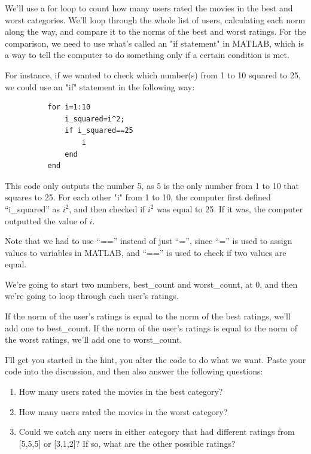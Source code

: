 \documentclass{ximera}
\begin{document}
    We'll use a for loop to count how many users rated the movies in the best and worst categories. We'll loop through the whole list of users, calculating each norm along the way, and compare it to the norms of the best and worst ratings. For the comparison, we need to use what's called an "if statement" in MATLAB, which is a way to tell the computer to do something only if a certain condition is met.

    \begin{example}

      For instance, if we wanted to check which number(s) from 1 to 10 squared to 25, we could use an "if" statement in the following way:
      \begin{verbatim}
          for i=1:10
              i_squared=i^2;
              if i_squared==25
                  i
              end
          end
      \end{verbatim}

      This code only outputs the number 5, as 5 is the only number from 1 to 10 that squares to 25. For each other "i" from 1 to 10, the computer first defined ``i\_squared'' as $i^2$, and then checked if $i^2$ was equal to 25. If it was, the computer outputted the value of $i$.

      Note that we had to use ``=='' instead of just ``='', since ``='' is used to assign values to variables in MATLAB, and ``=='' is used to check if two values are equal.

    \end{example}
    
    We're going to start two numbers, best\_count and worst\_count, at 0, and then we're going to loop through each user's ratings. 
    
    If the norm of the user's ratings is equal to the norm of the best ratings, we'll add one to best\_count. If the norm of the user's ratings is equal to the norm of the worst ratings, we'll add one to worst\_count.

    I'll get you started in the hint, you alter the code to do what we want. Paste your code into the discussion, and then also answer the following questions:

    \begin{enumerate}

      \item How many users rated the movies in the best category?
      \item How many users rated the movies in the worst category?
      \item Could we catch any users in either category that had different ratings from [5,5,5] or [3,1,2]? If so, what are the other possible ratings?
      
    \end{enumerate}
\end{document}
